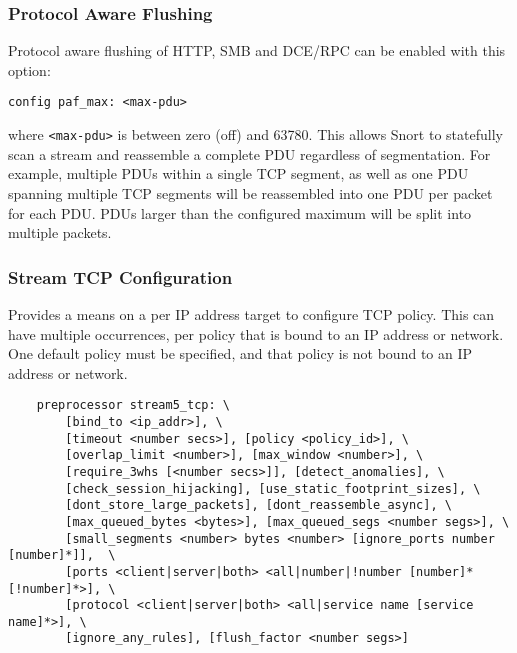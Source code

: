 \documentclass[english]{report}
\begin{document}
\subsubsection{Protocol Aware Flushing}

Protocol aware flushing of HTTP, SMB and DCE/RPC can be enabled with this option:

\begin{verbatim}
config paf_max: <max-pdu>
\end{verbatim}

where \texttt{<max-pdu>} is between zero (off) and 63780.  This allows Snort to
statefully scan a stream and reassemble a complete PDU regardless of
segmentation.  For example, multiple PDUs within a single TCP segment, as well
as one PDU spanning multiple TCP segments will be reassembled into one PDU per
packet for each PDU.  PDUs larger than the configured maximum will be split
into multiple packets.

\subsubsection{Stream TCP Configuration}

Provides a means on a per IP address target to configure TCP policy.  This can
have multiple occurrences, per policy that is bound to an IP address or network.
One default policy must be specified, and that policy is not bound to an IP
address or network.

\begin{verbatim}
    preprocessor stream5_tcp: \
        [bind_to <ip_addr>], \
        [timeout <number secs>], [policy <policy_id>], \
        [overlap_limit <number>], [max_window <number>], \
        [require_3whs [<number secs>]], [detect_anomalies], \
        [check_session_hijacking], [use_static_footprint_sizes], \
        [dont_store_large_packets], [dont_reassemble_async], \
        [max_queued_bytes <bytes>], [max_queued_segs <number segs>], \
        [small_segments <number> bytes <number> [ignore_ports number [number]*]],  \
        [ports <client|server|both> <all|number|!number [number]* [!number]*>], \
        [protocol <client|server|both> <all|service name [service name]*>], \
        [ignore_any_rules], [flush_factor <number segs>]
\end{verbatim}
\end{document}
